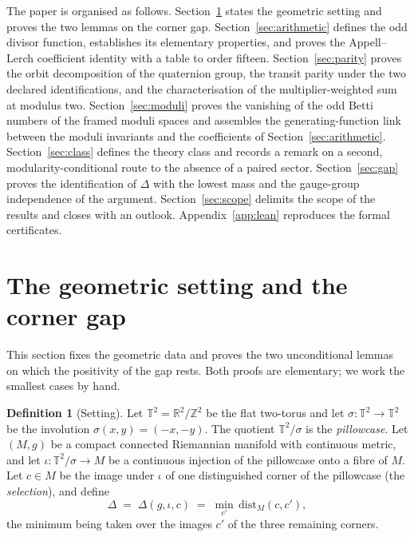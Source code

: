 \documentclass[11pt,a4paper]{article}
\newcommand{\T}{\mathbb{T}}
\newcommand{\R}{\mathbb{R}}
\newcommand{\Z}{\mathbb{Z}}
\newcommand{\dist}{\mathrm{dist}}
\theoremstyle{plain}
\theoremstyle{definition}
\newtheorem{definition}[theorem]{Definition}
\theoremstyle{remark}
\begin{document}
The paper is organised as follows. Section~\ref{sec:setting} states the geometric setting and proves the two lemmas on the corner gap. Section~\ref{sec:arithmetic} defines the odd divisor function, establishes its elementary properties, and proves the Appell--Lerch coefficient identity with a table to order fifteen. Section~\ref{sec:parity} proves the orbit decomposition of the quaternion group, the transit parity under the two declared identifications, and the characterisation of the multiplier-weighted sum at modulus two. Section~\ref{sec:moduli} proves the vanishing of the odd Betti numbers of the framed moduli spaces and assembles the generating-function link between the moduli invariants and the coefficients of Section~\ref{sec:arithmetic}. Section~\ref{sec:class} defines the theory class and records a remark on a second, modularity-conditional route to the absence of a paired sector. Section~\ref{sec:gap} proves the identification of $\Delta$ with the lowest mass and the gauge-group independence of the argument. Section~\ref{sec:scope} delimits the scope of the results and closes with an outlook. Appendix~\ref{app:lean} reproduces the formal certificates.

\section{The geometric setting and the corner gap}\label{sec:setting}

This section fixes the geometric data and proves the two unconditional lemmas on which the positivity of the gap rests. Both proofs are elementary; we work the smallest cases by hand.

\begin{definition}[Setting]\label{def:setting}
Let $\T^2 = \R^2/\Z^2$ be the flat two-torus and let $\sigma \colon \T^2 \to \T^2$ be the involution $\sigma(x,y) = (-x,-y)$. The quotient $\T^2/\sigma$ is the \emph{pillowcase}. Let $(M,g)$ be a compact connected Riemannian manifold with continuous metric, and let $\iota \colon \T^2/\sigma \to M$ be a continuous injection of the pillowcase onto a fibre of $M$. Let $c \in M$ be the image under $\iota$ of one distinguished corner of the pillowcase (the \emph{selection}), and define
\begin{equation}\label{eq:gapdef}
  \Delta \;=\; \Delta(g, \iota, c) \;=\;
  \min_{c'} \, \dist_M(c, c'),
\end{equation}
the minimum being taken over the images $c'$ of the three remaining corners.
\end{definition}
\end{document}
